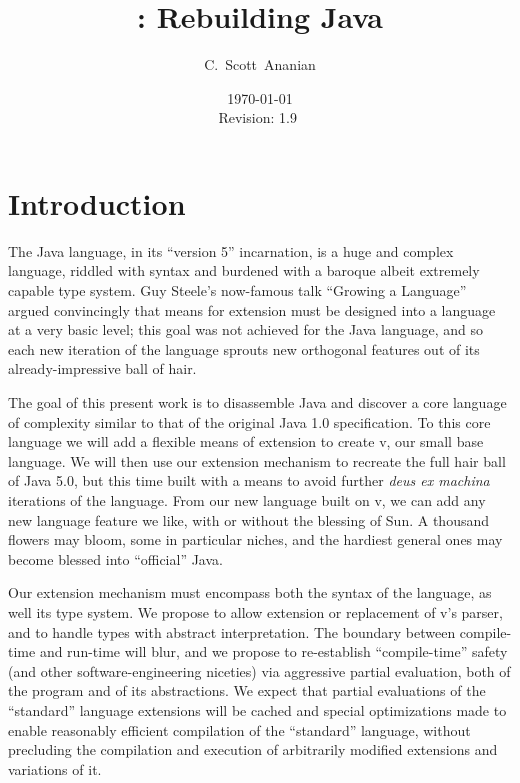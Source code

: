 \documentclass[11pt,notitlepage,twocolumn]{article}
\author{C.~Scott~Ananian}
\title{\vlang: Rebuilding Java}
\date{\today \\ $ $Revision: 1.9 $ $}
\newcommand{\vlang}{\textsf{v}\xspace}
\begin{document}

\maketitle

\section{Introduction}
The Java language, in its ``version 5'' incarnation, is a huge and
complex language, riddled with syntax and burdened with a baroque
albeit extremely capable type system.  Guy Steele's now-famous talk
``Growing a Language'' \cite{Steele99} argued convincingly that means
for extension must be designed into a language at a very basic level;
this goal was not achieved for the Java language, and so each new
iteration of the language sprouts new orthogonal features out of its
already-impressive ball of hair.

The goal of this present work is to disassemble Java and discover a
core language of complexity similar to that of the original Java
1.0 specification.  To this core language we will add a flexible means
of extension to create \vlang, our small base language.  We will then use
our extension mechanism to recreate the full hair ball of Java 5.0,
but this time built with a means to avoid further \emph{deus ex
  machina} iterations of the language.  From our new language built on
\vlang, we can add any new language feature we like, with or without the
blessing of Sun.  A thousand flowers may bloom, some in particular
niches, and the hardiest general ones may become blessed into
``official'' Java.

Our extension mechanism must encompass both the syntax of the
language, as well its type system.  We propose to allow extension or
replacement of \vlang's parser, and to handle types with abstract
interpretation.  The boundary between compile-time and run-time will
blur, and we propose to re-establish ``compile-time'' safety (and
other software-engineering niceties) via aggressive partial
evaluation, both of the program and of its abstractions.  We expect
that partial evaluations of the ``standard'' language extensions will
be cached and special optimizations made to enable reasonably
efficient compilation of the ``standard'' language, without precluding
the compilation and execution of arbitrarily modified extensions and
variations of it.
\end{document}
